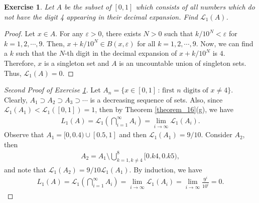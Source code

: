 \documentclass[11pt]{book}
\newtheorem{exercise}{Exercise}[section]
\theoremstyle{definition}
\numberwithin{equation}{chapter}
\def\L{{\mathcal L}}
\begin{document}
\medskip

\begin{exercise}\label{exe_116}
Let $A$ be the subset of $[0,1]$ which consists of all numbers which do not have the digit 4 appearing in their decimal expansion. Find $\mathcal{L}_1(A)$.
\end{exercise}
\begin{proof}\cite{22}
Let $x \in A$. For any $\varepsilon > 0$, there exists $N > 0$ such that $k/10^N < \varepsilon$ for $k = 1,2,\cdots,9$. Then, $x + k/10^N \in B(x,\varepsilon)$ for all $k = 1,2,\cdots,9$. Now, we can find a $k$ such that the $N$-th digit in the decimal expansion of $x + k/10^N$ is $4$. Therefore, $x$ is a singleton set and $A$ is an uncountable union of singleton sets. Thus, $\mathcal{L}_1(A) = 0$.
\end{proof}

\medskip

\begin{proof}[Second Proof of Exercise \ref{exe_116}]
Let $A_n = \{x \in [0,1] \,:\, \text{first $n$ digits of } x \neq 4 \}$. Clearly, $A_1 \supset A_2 \supset A_3 \supset \cdots$ is a decreasing sequence of sets. Also, since $\L_1(A_1) < \L_1([0,1]) = 1$, then by Theorem \ref{theorem_16}(g), we have
\begin{align*}
    L_1(A) = \L_1\left(\bigcap^\infty_{i=1} A_i\right) = \lim_{i\to\infty} \L_1(A_i).
\end{align*}
Observe that $A_1 = [0,0.4) \cup [0.5,1]$ and then $\L_1(A_1) = 9/10$. Consider $A_2$, then
\begin{align*}
    A_2 = A_1 \setminus \bigcup^8_{k=1,k\neq 4}[0.k4,0.k5),
\end{align*}
and note that $\L_1(A_2) = 9/10 \L_1(A_1)$. By induction, we have
\begin{align*}
    L_1(A) = \L_1\left(\bigcap^\infty_{i=1} A_i\right) = \lim_{i\to\infty} \L_1(A_i) = \lim_{i\to\infty} \frac{9^i}{10^i} = 0.
\end{align*}
\end{proof}

\medskip
\end{document}
